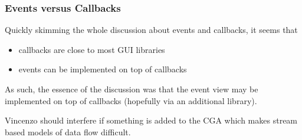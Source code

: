 \documentclass{article}
\begin{document}
\subsubsection{Events versus Callbacks}
Quickly skimming the whole discussion about events and callbacks, it
seems that
\begin{itemize}
\item callbacks are close to most GUI libraries
\item events can be implemented on top of callbacks
\end{itemize}
As such, the essence of the discussion was that the event view may be
implemented on top of callbacks (hopefully via an additional library).

Vincenzo should interfere if something is added to the CGA which makes
stream based models of data flow difficult.
\end{document}
